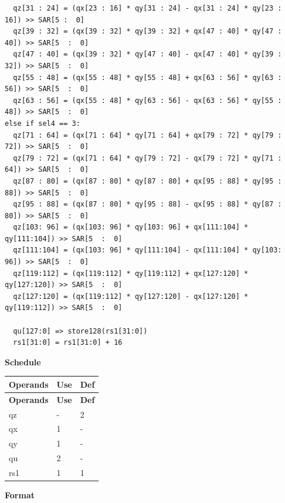 \begin{lstlisting}
  qz[31 : 24] = (qx[23 : 16] * qy[31 : 24] - qx[31 : 24] * qy[23 : 16]) >> SAR[5 :  0]
  qz[39 : 32] = (qx[39 : 32] * qy[39 : 32] + qx[47 : 40] * qy[47 : 40]) >> SAR[5  :  0]
  qz[47 : 40] = (qx[39 : 32] * qy[47 : 40] - qx[47 : 40] * qy[39 : 32]) >> SAR[5  :  0]
  qz[55 : 48] = (qx[55 : 48] * qy[55 : 48] + qx[63 : 56] * qy[63 : 56]) >> SAR[5  :  0]
  qz[63 : 56] = (qx[55 : 48] * qy[63 : 56] - qx[63 : 56] * qy[55 : 48]) >> SAR[5  :  0]
else if sel4 == 3:
  qz[71 : 64] = (qx[71 : 64] * qy[71 : 64] + qx[79 : 72] * qy[79 : 72]) >> SAR[5  :  0]
  qz[79 : 72] = (qx[71 : 64] * qy[79 : 72] - qx[79 : 72] * qy[71 : 64]) >> SAR[5  :  0]
  qz[87 : 80] = (qx[87 : 80] * qy[87 : 80] + qx[95 : 88] * qy[95 : 88]) >> SAR[5  :  0]
  qz[95 : 88] = (qx[87 : 80] * qy[95 : 88] - qx[95 : 88] * qy[87 : 80]) >> SAR[5  :  0]
  qz[103: 96] = (qx[103: 96] * qy[103: 96] + qx[111:104] * qy[111:104]) >> SAR[5  :  0]
  qz[111:104] = (qx[103: 96] * qy[111:104] - qx[111:104] * qy[103: 96]) >> SAR[5  :  0]
  qz[119:112] = (qx[119:112] * qy[119:112] + qx[127:120] * qy[127:120]) >> SAR[5  :  0]
  qz[127:120] = (qx[119:112] * qy[127:120] - qx[127:120] * qy[119:112]) >> SAR[5  :  0]

  qu[127:0] => store128(rs1[31:0])
  rs1[31:0] = rs1[31:0] + 16
\end{lstlisting}


\textbf{Schedule}\\
\begin{longtable}[c]{|l|l|l|}
    \hline
    \rowcolor{lightgray}
    \textbf{Operands} & \textbf{Use} & \textbf{Def} \\\hline
    \endfirsthead
    \hline
    \rowcolor{lightgray}
     \textbf{Operands} & \textbf{Use} & \textbf{Def} \\\hline
    \endhead
    \hline
    \endfoot


    qz & - & 2 \\\hline
     qx & 1 & - \\\hline
     qy & 1 & - \\\hline
     qu & 2 & - \\\hline
     rs1 & 1 & 1

\end{longtable}

\textbf{Format}\\


